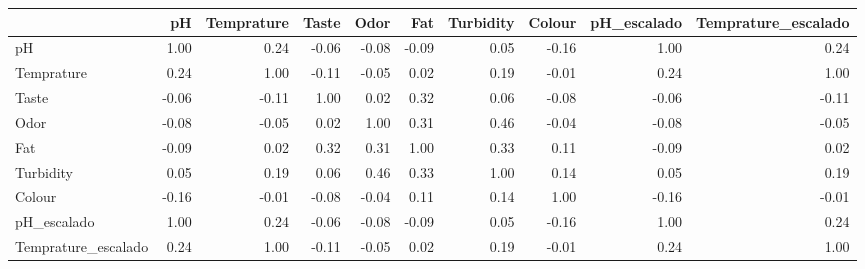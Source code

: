 \begin{tabular}{lrrrrrrrrr}
\toprule
 & pH & Temprature & Taste & Odor & Fat  & Turbidity & Colour & pH\_escalado & Temprature\_escalado \\
\midrule
pH & 1.00 & 0.24 & -0.06 & -0.08 & -0.09 & 0.05 & -0.16 & 1.00 & 0.24 \\
Temprature & 0.24 & 1.00 & -0.11 & -0.05 & 0.02 & 0.19 & -0.01 & 0.24 & 1.00 \\
Taste & -0.06 & -0.11 & 1.00 & 0.02 & 0.32 & 0.06 & -0.08 & -0.06 & -0.11 \\
Odor & -0.08 & -0.05 & 0.02 & 1.00 & 0.31 & 0.46 & -0.04 & -0.08 & -0.05 \\
Fat  & -0.09 & 0.02 & 0.32 & 0.31 & 1.00 & 0.33 & 0.11 & -0.09 & 0.02 \\
Turbidity & 0.05 & 0.19 & 0.06 & 0.46 & 0.33 & 1.00 & 0.14 & 0.05 & 0.19 \\
Colour & -0.16 & -0.01 & -0.08 & -0.04 & 0.11 & 0.14 & 1.00 & -0.16 & -0.01 \\
pH\_escalado & 1.00 & 0.24 & -0.06 & -0.08 & -0.09 & 0.05 & -0.16 & 1.00 & 0.24 \\
Temprature\_escalado & 0.24 & 1.00 & -0.11 & -0.05 & 0.02 & 0.19 & -0.01 & 0.24 & 1.00 \\
\bottomrule
\end{tabular}